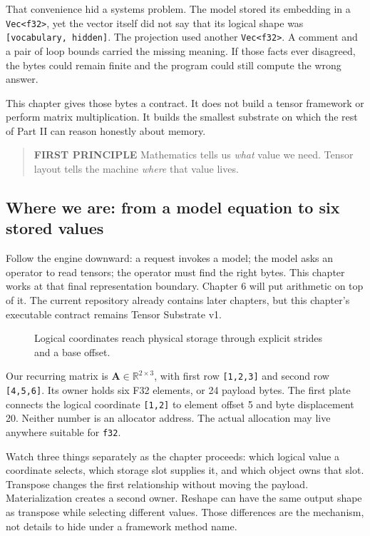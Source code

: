 \documentclass[
  10pt,
]{article}
\begin{document}
That convenience hid a systems problem. The model stored its embedding
in a \texttt{Vec\textless{}f32\textgreater{}}, yet the vector itself did
not say that its logical shape was \texttt{{[}vocabulary,\ hidden{]}}.
The projection used another \texttt{Vec\textless{}f32\textgreater{}}. A
comment and a pair of loop bounds carried the missing meaning. If those
facts ever disagreed, the bytes could remain finite and the program
could still compute the wrong answer.

This chapter gives those bytes a contract. It does not build a tensor
framework or perform matrix multiplication. It builds the smallest
substrate on which the rest of Part II can reason honestly about memory.

\begin{quote}
\textbf{FIRST PRINCIPLE} Mathematics tells us \emph{what} value we need.
Tensor layout tells the machine \emph{where} that value lives.
\end{quote}

\subsection{Where we are: from a model equation to six stored
values}\label{where-we-are-from-a-model-equation-to-six-stored-values}

Follow the engine downward: a request invokes a model; the model asks an
operator to read tensors; the operator must find the right bytes. This
chapter works at that final representation boundary. Chapter 6 will put
arithmetic on top of it. The current repository already contains later
chapters, but this chapter's executable contract remains Tensor
Substrate v1.

\begin{figure}[H]\centering\resizebox{\linewidth}{!}{}\caption{Logical coordinates reach physical storage through explicit strides and a base offset.}\end{figure}

Our recurring matrix is \(\mathbf{A}\in\mathbb{R}^{2\times3}\), with
first row \texttt{{[}1,2,3{]}} and second row \texttt{{[}4,5,6{]}}. Its
owner holds six F32 elements, or 24 payload bytes. The first plate
connects the logical coordinate \texttt{{[}1,2{]}} to element offset 5
and byte displacement 20. Neither number is an allocator address. The
actual allocation may live anywhere suitable for \texttt{f32}.

Watch three things separately as the chapter proceeds: which logical
value a coordinate selects, which storage slot supplies it, and which
object owns that slot. Transpose changes the first relationship without
moving the payload. Materialization creates a second owner. Reshape can
have the same output shape as transpose while selecting different
values. Those differences are the mechanism, not details to hide under a
framework method name.
\end{document}
